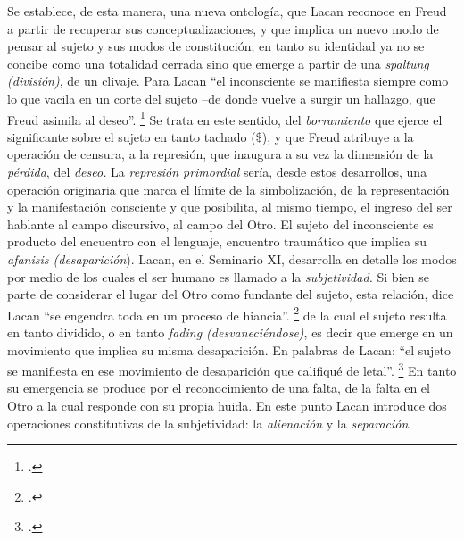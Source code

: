 Se establece, de esta manera, una nueva ontología, que Lacan reconoce en Freud a partir de recuperar sus conceptualizaciones, y que implica un nuevo modo de pensar al sujeto y sus modos de constitución; en tanto su identidad ya no se concibe como una totalidad cerrada sino que emerge a partir de una \emph{spaltung (división)}, de un clivaje. Para Lacan \enquote{el inconsciente se manifiesta siempre como lo que vacila en un corte del sujeto --de donde vuelve a surgir un hallazgo, que Freud asimila al deseo}. \footcite[][35]{@7106-LACAN2006} Se trata en este sentido, del \emph{borramiento} que ejerce el significante sobre el sujeto en tanto tachado (\$), y que Freud atribuye a la operación de censura, a la represión, que inaugura a su vez la dimensión de la \emph{pérdida}, del \emph{deseo.} La \emph{represión primordial} sería, desde estos desarrollos, una operación originaria que marca el límite de la simbolización, de la representación y la manifestación consciente y que posibilita, al mismo tiempo, el ingreso del ser hablante al campo discursivo, al campo del Otro. El sujeto del inconsciente es producto del encuentro con el lenguaje, encuentro traumático que implica su \emph{afanisis (desaparición}). Lacan, en el Seminario XI, desarrolla en detalle los modos por medio de los cuales el ser humano es llamado a la \emph{subjetividad.} Si bien se parte de considerar el lugar del Otro como fundante del sujeto, esta relación, dice Lacan \enquote{se engendra toda en un proceso de hiancia}. \footcite[][214]{@7106-LACAN2006} de la cual el sujeto resulta en tanto dividido, o en tanto \emph{fading (desvaneciéndose)}, es decir que emerge en un movimiento que implica su misma desaparición. En palabras de Lacan: \enquote{el sujeto se manifiesta en ese movimiento de desaparición que califiqué de letal}. \footcite[][216]{@7106-LACAN2006} En tanto su emergencia se produce por el reconocimiento de una falta, de la falta en el Otro a la cual responde con su propia huida. En este punto Lacan introduce dos operaciones constitutivas de la subjetividad: la \emph{alienación} y la \emph{separación}.


